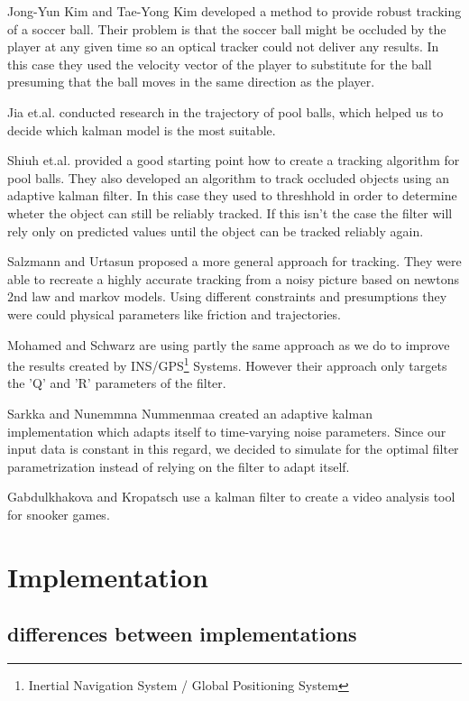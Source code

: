 \documentclass[notitlepage, a4paper, 11pt]{scrartcl}
\begin{document}
\begin{multicols}{2}
Jong-Yun Kim and Tae-Yong Kim \cite{kim} developed a method to provide robust tracking of a soccer ball. Their problem is that the soccer ball might be occluded by the player at any given time
so an optical tracker could not deliver any results. In this case they used the velocity vector of the player to substitute for the ball presuming that the ball moves in the same direction as the player.

Jia et.al. \cite{jia} conducted research in the trajectory of pool balls, which helped us to decide which kalman model is the most suitable.

Shiuh et.al. \cite{shiuh} provided a good starting point how to create a tracking algorithm for pool balls. They also developed an algorithm to track occluded objects using an adaptive kalman filter.
In this case they used to threshhold in order to determine wheter the object can still be reliably tracked. If this isn't the case the filter will rely only on predicted values until the object can be tracked reliably again.

Salzmann and Urtasun \cite{salzmann} proposed a more general approach for tracking. They were able to recreate a highly accurate tracking from a noisy picture based on newtons 2nd law and markov models.
Using different constraints and presumptions they were could physical parameters like friction and trajectories.

Mohamed and Schwarz \cite{schwarz} are using partly the same approach as we do to improve the results created by INS/GPS\footnote{Inertial Navigation System / Global Positioning System} Systems.
However their approach only targets the 'Q' and 'R' parameters of the filter.

Sarkka and Nunemmna Nummenmaa \cite{sarkka} created an adaptive kalman implementation which adapts itself to time-varying noise parameters. Since our input data is constant in this regard,
we decided to simulate for the optimal filter parametrization instead of relying on the filter to adapt itself.

Gabdulkhakova and Kropatsch \cite{kropatsch} use a kalman filter to create a video analysis tool for snooker games. 

\section{Implementation}
\subsection{differences between implementations}


\end{multicols}
\end{document}
